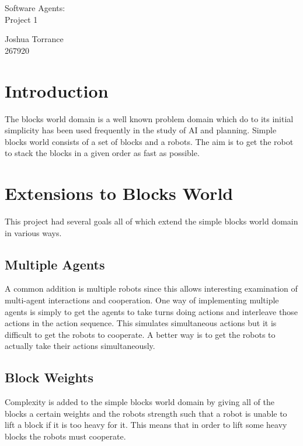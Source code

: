 \documentclass{article}
\begin{document}
	\begin{center}
		\huge
		Software Agents:\\
		Project 1
	\end{center}

	\begin{flushright}
		\normalsize
		Joshua Torrance\\
		267920
	\end{flushright}


\section{Introduction}

The blocks world domain is a well known problem domain which do to its initial
simplicity has been used frequently in the study of AI and planning. Simple
blocks world consists of a set of blocks and a robots. The aim is to get the robot
to stack the blocks in a given order as fast as possible.

\section{Extensions to Blocks World}
This project had several goals all of which extend the simple blocks world domain
in various ways.

\subsection{Multiple Agents}

A common addition is multiple robots since this allows interesting examination
of multi-agent interactions and cooperation. One way of implementing multiple
agents is simply to get the agents to take turns doing actions and interleave
those actions in the action sequence. This simulates simultaneous actions but
it is difficult to get the robots to cooperate. A better way is to get the robots
to actually take their actions simultaneously.


\subsection{Block Weights}

Complexity is added to the simple blocks world domain by giving all of the
blocks a certain weights and the robots strength such that a robot is unable to
lift a block if it is too heavy for it. This means that in order to lift some heavy
blocks the robots must cooperate.
\end{document}
